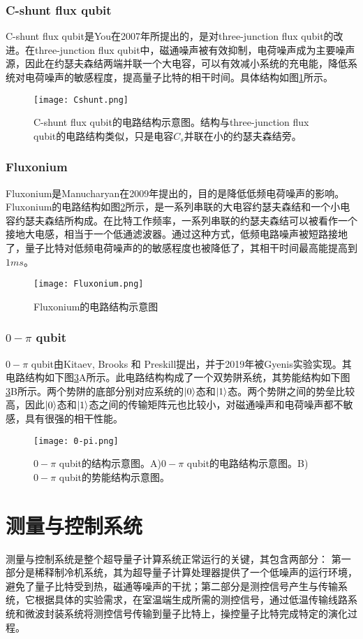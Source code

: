 \subsubsection{C-shunt flux qubit }
C-shunt flux qubit是You在2007年所提出的，是对three-junction flux qubit的改进。在three-junction flux qubit中，磁通噪声被有效抑制，电荷噪声成为主要噪声源，因此在约瑟夫森结两端并联一个大电容，可以有效减小系统的充电能，降低系统对电荷噪声的敏感程度，提高量子比特的相干时间。具体结构如图\ref{fig:Cshunt}所示。
\begin{figure}[h]
	\centering
	\texttt{[image: Cshunt.png]}
	\caption{C-shunt flux qubit的电路结构示意图。结构与three-junction flux qubit的电路结构类似，只是电容$C_{s}$并联在小的约瑟夫森结旁。}
	\label{fig:Cshunt}
\end{figure}
\subsubsection{Fluxonium}
Fluxonium是Manucharyan在2009年提出的，目的是降低低频电荷噪声的影响。Fluxonium的电路结构如图\ref{fig:Fluxonium}所示，是一系列串联的大电容约瑟夫森结和一个小电容约瑟夫森结所构成。在比特工作频率，一系列串联的约瑟夫森结可以被看作一个接地大电感，相当于一个低通滤波器。通过这种方式，低频电路噪声被短路接地了，量子比特对低频电荷噪声的的敏感程度也被降低了，其相干时间最高能提高到$1 ms$。
\begin{figure}[h]
	\centering
	\texttt{[image: Fluxonium.png]}
	\caption{Fluxonium的电路结构示意图}
	\label{fig:Fluxonium}
\end{figure}

\subsubsection{$0-\pi$ qubit}
$0-\pi$ qubit由Kitaev, Brooks 和 Preskill提出，并于2019年被Gyenis实验实现。其电路结构如下图\ref{fig:0-pi}A所示。此电路结构构成了一个双势阱系统，其势能结构如下图\ref{fig:0-pi}B所示。两个势阱的底部分别对应系统的$\left|0\right>$态和$\left|1\right>$态。两个势阱之间的势垒比较高，因此$\left|0\right>$态和$\left|1\right>$态之间的传输矩阵元也比较小，对磁通噪声和电荷噪声都不敏感，具有很强的相干性能。

\begin{figure}[h]
	\centering
	\texttt{[image: 0-pi.png]}
	\caption{$0-\pi$ qubit的结构示意图。A)$0-\pi$ qubit的电路结构示意图。B)$0-\pi$ qubit的势能结构示意图。}
	\label{fig:0-pi}
\end{figure}
\section{测量与控制系统}
测量与控制系统是整个超导量子计算系统正常运行的关键，其包含两部分：
第一部分是稀释制冷机系统，其为超导量子计算处理器提供了一个低噪声的运行环境，避免了量子比特受到热，磁通等噪声的干扰\cite{bertet2005dephasing,kumar2016origin}；第二部分是测控信号产生与传输系统，它根据具体的实验需求，在室温端生成所需的测控信号，通过低温传输线路系统和微波封装系统将测控信号传输到量子比特上，操控量子比特完成特定的演化过程。
